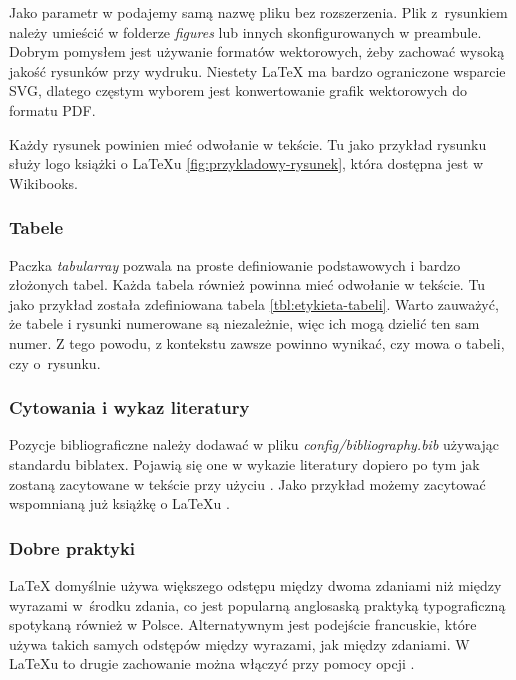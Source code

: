 Jako parametr w  podajemy samą
nazwę pliku bez rozszerzenia. Plik z~rysunkiem należy umieścić
w folderze \emph{figures} lub innych skonfigurowanych w preambule.
Dobrym pomysłem jest używanie formatów wektorowych, żeby zachować wysoką
jakość rysunków przy wydruku. Niestety LaTeX ma bardzo ograniczone
wsparcie SVG, dlatego częstym wyborem jest konwertowanie grafik
wektorowych do formatu PDF.

Każdy rysunek powinien mieć odwołanie w tekście. Tu jako przykład
rysunku służy logo książki o LaTeXu \ref{fig:przykladowy-rysunek}, która
dostępna jest w Wikibooks.

\subsubsection{Tabele}



Paczka \emph{tabularray} pozwala na proste definiowanie podstawowych
i bardzo złożonych tabel. Każda tabela również powinna mieć odwołanie
w tekście. Tu jako przykład została zdefiniowana tabela
\ref{tbl:etykieta-tabeli}. Warto zauważyć, że tabele i rysunki
numerowane są niezależnie, więc ich mogą dzielić ten sam numer. Z tego
powodu, z kontekstu zawsze powinno wynikać, czy mowa o tabeli, czy
o~rysunku.

\subsubsection{Cytowania i wykaz literatury}

Pozycje bibliograficzne należy dodawać w pliku
\emph{config/bibliography.bib} używając standardu biblatex. Pojawią się
one w wykazie literatury dopiero po tym jak zostaną zacytowane w tekście
przy użyciu . Jako przykład możemy zacytować
wspomnianą już książkę o LaTeXu \cite{book:latex}.

\subsubsection{Dobre praktyki}

LaTeX domyślnie używa większego odstępu między dwoma zdaniami niż między
wyrazami w~środku zdania, co jest popularną
anglosaską praktyką typograficzną spotykaną również w Polsce.
Alternatywnym jest podejście francuskie, które używa takich samych
odstępów między wyrazami, jak między zdaniami. W LaTeXu to drugie
zachowanie można włączyć przy pomocy opcji
.

